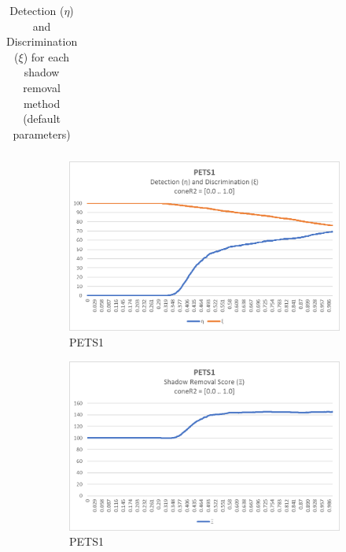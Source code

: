 \begin{appendices}
\begin{table}
\begin{tabular}{ |c|c|c|c|c|c|c|c|c|c|c| }
\hline
\end{tabular}
\caption*{Detection ($\eta$) and Discrimination ($\xi$) for each shadow removal method (default parameters)}
\end{table}

\clearpage
\FloatBarrier
\begin{figure}
  \begin{subfigure}{.45\linewidth}
  \includegraphics[width=1\linewidth]{figures/appendix/pets1_coneR2_response.jpg}
  \caption{PETS1}
\end{subfigure}
\hfill
\begin{subfigure}{.45\linewidth}
  \includegraphics[width=1\linewidth]{figures/appendix/pets1_coneR2_score.jpg}
  \caption{PETS1}
\end{subfigure}
\hfill
\begin{subfigure}{.45\linewidth}

\end{subfigure}
\end{figure}
\end{appendices}
